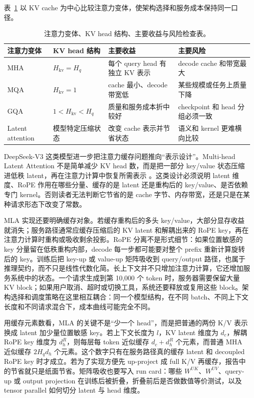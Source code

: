 \documentclass[UTF8,zihao=-4,openany]{ctexbook}
\begin{document}
表~\ref{tab:zh-attention-kv-variants} 以 KV cache 为中心比较注意力变体，使架构选择和服务成本保持同一口径。

\begin{table}[t]
\centering
\small
\setlength{\tabcolsep}{3pt}
\begin{tabular}{p{}p{}p{}p{}}
\toprule
注意力变体 & KV head 结构 & 主要收益 & 主要风险 \\
\midrule
MHA & $H_{\mathrm{kv}}=H_q$ & 每个 query head 有独立 KV 表示 & decode cache 和带宽最大 \\
MQA & $H_{\mathrm{kv}}=1$ & cache 最小、decode 带宽低 & 某些规模或任务上质量下降 \\
GQA & $1<H_{\mathrm{kv}}<H_q$ & 质量和服务成本折中较好 & checkpoint 和 head 分组必须一致 \\
Latent attention & 模型特定压缩状态 & 改变 cache 表示并节省状态 & 语义和 kernel 更难横向比较 \\
\bottomrule
\end{tabular}
\caption{注意力变体、KV head 结构、主要收益与风险检查表。}
\label{tab:zh-attention-kv-variants}
\end{table}

DeepSeek-V3 这类模型进一步把注意力缓存问题推向“表示设计”。Multi-head Latent Attention 不是简单减少 KV head 数，而是把一部分 key/value 状态压缩进低秩 latent，再在注意力计算中恢复所需表示 \cite{deepseek2024v3}。这类设计必须说明 latent 维度、RoPE 作用在哪些分量、缓存的是 latent 还是重构后的 key/value、是否依赖专门 kernel。否则读者无法判断它节省的是 cache 字节、内存带宽，还是只是在某种请求形态下改变了常数。

MLA 实现还要明确缓存对象。若缓存重构后的多头 key/value，大部分显存收益就消失；服务路径通常应缓存压缩后的 KV latent 和解耦出来的 RoPE key，再在注意力计算时重构或吸收剩余投影。RoPE 分离不是形式细节：如果位置敏感的 key 分量留在低秩重构内部，decode 每一步都可能要对整个 prefix 重新计算旋转后的 key。训练后把 key-up 或 value-up 矩阵吸收到 query/output 路径，也属于推理契约，而不只是线性代数化简。长上下文并不只增加注意力计算，它还增加服务系统中的状态。一个请求生成到第 10,000 个 token 时，服务器需要保留大量 KV block；如果用户取消、超时或切换工具，系统还要释放或复用这些 block。架构选择和调度策略在这里相互耦合：同一个模型结构，在不同 batch、不同上下文长度和不同请求混合下，成本曲线可能完全不同。

用缓存元素数看，MLA 的关键不是“少一个 head”，而是把普通的两份 K/V 表示换成 latent 加少量位置敏感 key。若上下文长度为 $l$，KV latent 维度为 $d_c$，解耦 RoPE key 维度为 $d_h^R$，则每层每 token 近似缓存 $d_c+d_h^R$ 个元素，而普通 MHA 近似缓存 $2H_qd_h$ 个元素。这个数字只有在服务路径真的缓存 latent 和 decoupled RoPE key 时才成立。若为了实现方便先 up-project 成 full K/V 再缓存，报告中的节省就只是纸面节省。矩阵吸收也要写入 run card：哪些 $W^{UK}$、$W^{UV}$、query-up 或 output projection 在训练后被折叠，折叠前后是否做数值等价测试，以及 tensor parallel 如何切分 latent 与 head 维度。
\end{document}

